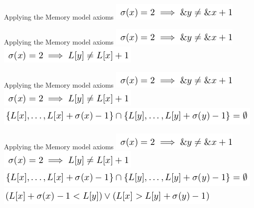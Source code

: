 \documentclass{beamer}
\begin{document}
\begin{frame}{Applying the Memory model axioms}
\includegraphics[scale=0.5]{meory1.png}\newline
\end{frame}

\begin{frame}{Applying the Memory model axioms}
\includegraphics[scale=0.5]{meory1.png}\newline
\includegraphics[scale=0.5]{meory2.png}\newline
\end{frame}

\begin{frame}{Applying the Memory model axioms}
\includegraphics[scale=0.5]{meory1.png}\newline
\includegraphics[scale=0.5]{meory2.png}\newline
\includegraphics[scale=0.5]{meory3.png}\newline
\end{frame}

\begin{frame}{Applying the Memory model axioms}
\includegraphics[scale=0.5]{meory1.png}\newline
\includegraphics[scale=0.5]{meory2.png}\newline
\includegraphics[scale=0.5]{meory3.png}\newline
\includegraphics[scale=0.5]{meory4.png}\newline
\end{frame}
\end{document}
